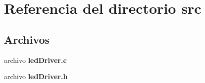 \section{Referencia del directorio src}
\label{dir_68267d1309a1af8e8297ef4c3efbcdba}
\subsection*{Archivos}
\begin{DoxyCompactItemize}
\item 
archivo {\bf led\-Driver.\-c}
\item 
archivo {\bf led\-Driver.\-h}
\end{DoxyCompactItemize}
